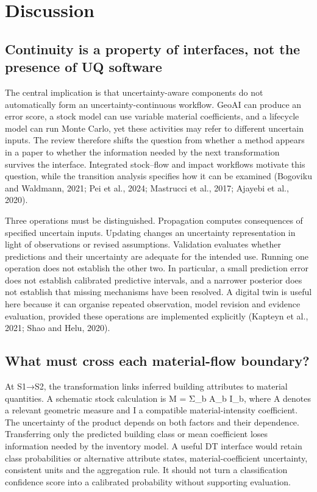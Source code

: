 \section{Discussion}

\subsection{Continuity is a property of interfaces, not the presence of UQ software}
The central implication is that uncertainty-aware components do not automatically form an uncertainty-continuous workflow. GeoAI can produce an error score, a stock model can use variable material coefficients, and a lifecycle model can run Monte Carlo, yet these activities may refer to different uncertain inputs. The review therefore shifts the question from whether a method appears in a paper to whether the information needed by the next transformation survives the interface. Integrated stock–flow and impact workflows motivate this question, while the transition analysis specifies how it can be examined (Bogoviku and Waldmann, 2021; Pei et al., 2024; Mastrucci et al., 2017; Ajayebi et al., 2020).

Three operations must be distinguished. Propagation computes consequences of specified uncertain inputs. Updating changes an uncertainty representation in light of observations or revised assumptions. Validation evaluates whether predictions and their uncertainty are adequate for the intended use. Running one operation does not establish the other two. In particular, a small prediction error does not establish calibrated predictive intervals, and a narrower posterior does not establish that missing mechanisms have been resolved. A digital twin is useful here because it can organise repeated observation, model revision and evidence evaluation, provided these operations are implemented explicitly (Kapteyn et al., 2021; Shao and Helu, 2020).


\subsection{What must cross each material-flow boundary?}
At S1→S2, the transformation links inferred building attributes to material quantities. A schematic stock calculation is M = Σ\_b A\_b I\_b, where A denotes a relevant geometric measure and I a compatible material-intensity coefficient. The uncertainty of the product depends on both factors and their dependence. Transferring only the predicted building class or mean coefficient loses information needed by the inventory model. A useful DT interface would retain class probabilities or alternative attribute states, material-coefficient uncertainty, consistent units and the aggregation rule. It should not turn a classification confidence score into a calibrated probability without supporting evaluation.

